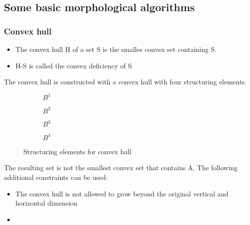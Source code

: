 \subsection{Some basic morphological algorithms}
\subsubsection{Convex hull}
\begin{itemize}
\item The convex hull H of a set S is the smalles convex set containing S.
\item H-S is called the convex deficiency of S
\end{itemize}
The convex hull is constructed with a convex hull with four structuring elements.
\begin{figure}[h]
	\centering
	\begin{subfigure}[b]{0.2\textwidth}
		\centering
		\caption{$B^1$}
	\end{subfigure}
	\begin{subfigure}[b]{0.2\textwidth}
		\centering
		\caption{$B^2$}
	\end{subfigure}
	\begin{subfigure}[b]{0.2\textwidth}
		\centering
		\caption{$B^3$}
	\end{subfigure}
	\begin{subfigure}[b]{0.2\textwidth}
		\centering
		\caption{$B^4$}
	\end{subfigure}
	\caption{Structuring elements for convex hull}
\end{figure}

The resulting set is not the smallest convex set that contains A. The following additional constraints can be used:
\begin{itemize}
\item The convex hull is not allowed to grow beyond the original vertical and horizontal dimension
\item 
\end{itemize}

